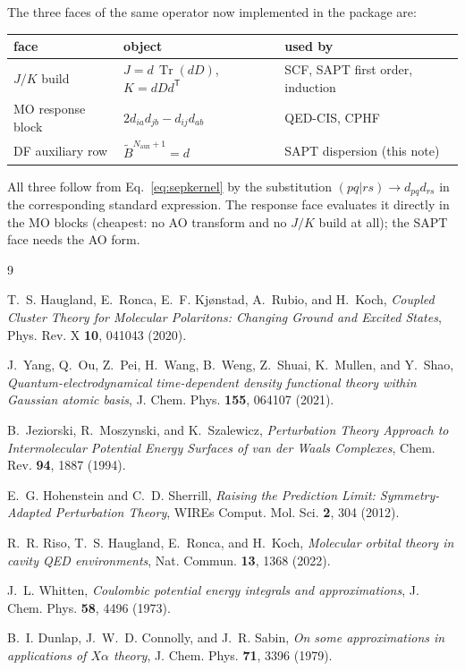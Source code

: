 \documentclass[11pt]{article}
\newcommand{\naux}{N_{\mathrm{aux}}}
\DeclareMathOperator{\Tr}{Tr}
\begin{document}
The three faces of the same operator now implemented in the package are:

\begin{center}
\small
\begin{tabular}{lll}
\toprule
face & object & used by \\
\midrule
$J/K$ build & $J = d\,\Tr(dD)$, \; $K = d D d^{\mathsf T}$ & SCF, SAPT first order, induction \\
MO response block & $2 d_{ia} d_{jb} - d_{ij} d_{ab}$ & QED-CIS, CPHF \\
DF auxiliary row & $\tilde B^{\naux+1} = d$ & SAPT dispersion (this note) \\
\bottomrule
\end{tabular}
\end{center}

\noindent
All three follow from Eq.~\eqref{eq:sepkernel} by the substitution
$(pq|rs)\to d_{pq}d_{rs}$ in the corresponding standard expression. The
response face evaluates it directly in the MO blocks (cheapest: no AO
transform and no $J/K$ build at all); the SAPT face needs the AO form.

\begin{thebibliography}{9}

T.~S. Haugland, E.~Ronca, E.~F. Kj{\o}nstad, A.~Rubio, and H.~Koch,
\emph{Coupled Cluster Theory for Molecular Polaritons: Changing Ground and
Excited States}, Phys. Rev. X \textbf{10}, 041043 (2020).

J.~Yang, Q.~Ou, Z.~Pei, H.~Wang, B.~Weng, Z.~Shuai, K.~Mullen, and Y.~Shao,
\emph{Quantum-electrodynamical time-dependent density functional theory within
Gaussian atomic basis}, J. Chem. Phys. \textbf{155}, 064107 (2021).

B.~Jeziorski, R.~Moszynski, and K.~Szalewicz,
\emph{Perturbation Theory Approach to Intermolecular Potential Energy Surfaces
of van der Waals Complexes}, Chem. Rev. \textbf{94}, 1887 (1994).

E.~G. Hohenstein and C.~D. Sherrill,
\emph{Raising the Prediction Limit: Symmetry-Adapted Perturbation Theory},
WIREs Comput. Mol. Sci. \textbf{2}, 304 (2012).

R.~R. Riso, T.~S. Haugland, E.~Ronca, and H.~Koch,
\emph{Molecular orbital theory in cavity QED environments},
Nat. Commun. \textbf{13}, 1368 (2022).

J.~L. Whitten,
\emph{Coulombic potential energy integrals and approximations},
J. Chem. Phys. \textbf{58}, 4496 (1973).

B.~I. Dunlap, J.~W.~D. Connolly, and J.~R. Sabin,
\emph{On some approximations in applications of $X\alpha$ theory},
J. Chem. Phys. \textbf{71}, 3396 (1979).

\end{thebibliography}
\end{document}
